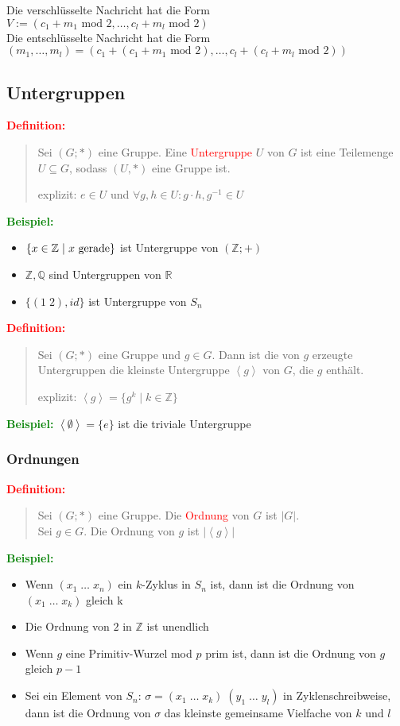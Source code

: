 \documentclass{article}
\newcommand{\smsp}{\phantom{\hspace{3px}}}
\newcommand{\red}[1]{\textcolor{red}{#1}}
\newcommand{\green}[1]{\textcolor{green}{#1}}
\newcommand{\ex}{\green{\textbf{Beispiel: }}}
\newcommand{\de}[1]{\red{\textbf{Definition: }}\begin{quote}#1\end{quote}}
\newcommand{\Z}{\mathbb{Z}}
\newcommand{\Q}{\mathbb{Q}}
\newcommand{\R}{\mathbb{R}}
\renewcommand{\st}{\smsp | \smsp}
\renewcommand{\mod}{\text{ mod }}
\newcommand{\spann}[1]{\left\langle#1\right\rangle}
\begin{document}
Die verschlüsselte Nachricht hat die Form\\
$V := (c_1 + m_1 \mod 2, \dots, c_l + m_l \mod 2)$\\
Die entschlüsselte Nachricht hat die Form \\
$(m_1, \dots, m_l) = (c_1 + (c_1 + m_1 \mod 2), \dots, c_l + (c_l + m_l \mod 2))$

\subsection{Untergruppen}

\de{
    Sei $(G; *)$ eine Gruppe. Eine \red{Untergruppe} $U$ von $G$ ist eine Teilemenge $U \subseteq G$, sodass $(U, *)$ eine Gruppe ist.

    explizit: $e \in U$ und $\forall g,h \in U: g \cdot h, g^{-1} \in U$
}

\ex \begin{itemize}
    \item $\{x \in \Z \st x \text{ gerade}\}$ ist Untergruppe von $(\Z; +)$
    \item $\Z, \Q$ sind Untergruppen von $\R$
    \item $\{(1 \; 2), id\}$ ist Untergruppe von $S_n$
\end{itemize}

\de{
    Sei $(G; *)$ eine Gruppe und $g \in G$. Dann ist die von $g$ erzeugte Untergruppen die kleinste Untergruppe $\spann{g}$ von $G$, die $g$ enthält.

    explizit: $\spann{g} = \{g^k \mid k \in \Z\}$
}

\ex $\spann{\emptyset} = \{e\}$ ist die triviale Untergruppe

\subsubsection{Ordnungen}

\de{
    Sei $(G; *)$ eine Gruppe. Die \red{Ordnung} von $G$ ist $|G|$.\\
    Sei $g \in G$. Die Ordnung von $g$ ist $|\spann{g}|$
}

\ex \begin{itemize}
    \item Wenn $(x_1 \; \dots \; x_n)$ ein $k$-Zyklus in $S_n$ ist, dann ist die Ordnung von $(x_1 \; \dots \; x_k)$ gleich k
    \item Die Ordnung von $2$ in $\Z$ ist unendlich
    \item Wenn $g$ eine Primitiv-Wurzel mod $p$ prim ist, dann ist die Ordnung von $g$ gleich $p-1$
    \item Sei ein Element von $S_n$: $\sigma = (x_1 \; \dots \; x_k) \; (y_1 \; \dots \; y_l)$ in Zyklenschreibweise, dann ist die Ordnung von $\sigma$ das kleinste gemeinsame Vielfache von $k$ und $l$
\end{itemize}
\end{document}
